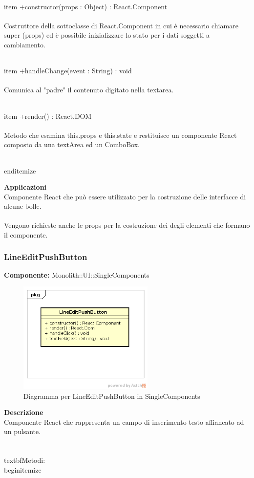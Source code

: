 \\item +constructor(props : Object) : React.Component 
\\\\
Costruttore della sottoclasse di React.Component in cui è necessario chiamare super (props) ed è possibile inizializzare lo stato per i dati soggetti a cambiamento.

\\item +handleChange(event : String) : void  
\\\\ 
Comunica al "padre" il contenuto digitato nella textarea.

\\item +render() : React.DOM 
\\\\
Metodo che esamina this.props e this.state e restituisce un componente React composto da una textArea ed un ComboBox.

\\end{itemize} 


\textbf{Applicazioni}\\
Componente React che può essere utilizzato per la costruzione delle interfacce di alcune bolle.
\\\\ Vengono richieste anche le props per la costruzione dei degli elementi che formano il componente. 


\clearpage

\subsubsection{LineEditPushButton}
\textbf{Componente:}  Monolith::UI::SingleComponents\\
   \FloatBarrier
   \begin{figure}[ht]
   \centering
   \includegraphics[width=0.6\textwidth]{img/single-LineEditPushButton}
   \caption{{Diagramma per LineEditPushButton in SingleComponents}}
\end{figure}
\FloatBarrier
\textbf{Descrizione}\\
Componente React che rappresenta un campo di inserimento testo affiancato ad un pulsante. \\\\
\\textbf{Metodi:} 
\\begin{itemize}

